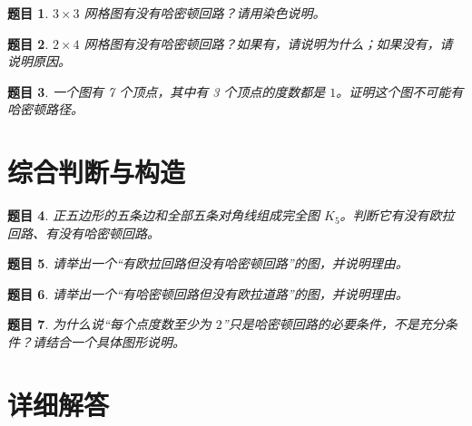 \documentclass[11pt,a4paper,fontset=fandol]{ctexart}
\theoremstyle{formalexample}
\newtheorem{exercise}{题目}[section]
\begin{document}
\begin{exercise}
$3\times 3$ 网格图有没有哈密顿回路？请用染色说明。
\end{exercise}

\begin{exercise}
$2\times 4$ 网格图有没有哈密顿回路？如果有，请说明为什么；如果没有，请说明原因。
\end{exercise}

\begin{exercise}
一个图有 7 个顶点，其中有 3 个顶点的度数都是 $1$。证明这个图不可能有哈密顿路径。
\end{exercise}

\section{综合判断与构造}

\begin{exercise}
正五边形的五条边和全部五条对角线组成完全图 $K_5$。判断它有没有欧拉回路、有没有哈密顿回路。
\end{exercise}

\begin{exercise}
请举出一个“有欧拉回路但没有哈密顿回路”的图，并说明理由。
\end{exercise}

\begin{exercise}
请举出一个“有哈密顿回路但没有欧拉道路”的图，并说明理由。
\end{exercise}

\begin{exercise}
为什么说“每个点度数至少为 $2$”只是哈密顿回路的必要条件，不是充分条件？请结合一个具体图形说明。
\end{exercise}

\newpage
\section{详细解答}
\end{document}
